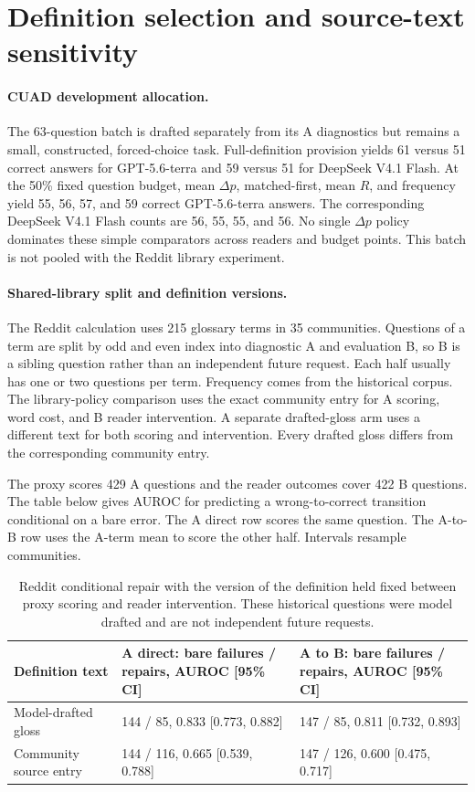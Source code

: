 \section{Definition selection and source-text sensitivity}
\label{app:new}
\paragraph{CUAD development allocation.}
The 63-question batch is drafted separately from its A diagnostics but remains a small, constructed, forced-choice task. Full-definition provision yields 61 versus 51 correct answers for GPT-5.6-terra and 59 versus 51 for DeepSeek V4.1 Flash. At the 50\% fixed question budget, mean $\Delta p$, matched-first, mean $R$, and frequency yield 55, 56, 57, and 59 correct GPT-5.6-terra answers. The corresponding DeepSeek V4.1 Flash counts are 56, 55, 55, and 56. No single $\Delta p$ policy dominates these simple comparators across readers and budget points. This batch is not pooled with the Reddit library experiment.

\paragraph{Shared-library split and definition versions.}
The Reddit calculation uses 215 glossary terms in 35 communities. Questions of a term are split by odd and even index into diagnostic A and evaluation B, so B is a sibling question rather than an independent future request. Each half usually has one or two questions per term. Frequency comes from the historical corpus. The library-policy comparison uses the exact community entry for A scoring, word cost, and B reader intervention. A separate drafted-gloss arm uses a different text for both scoring and intervention. Every drafted gloss differs from the corresponding community entry.

The proxy scores 429 A questions and the reader outcomes cover 422 B questions. The table below gives AUROC for predicting a wrong-to-correct transition conditional on a bare error. The A direct row scores the same question. The A-to-B row uses the A-term mean to score the other half. Intervals resample communities.

\begin{table}[htbp]\centering\small
\caption{Reddit conditional repair with the version of the definition held fixed between proxy scoring and reader intervention. These historical questions were model drafted and are not independent future requests.}
\label{tab:gold-source-repair}
\begin{tabular}{@{}p{2.8cm}p{4.3cm}p{4.3cm}@{}}\toprule
Definition text & A direct: bare failures / repairs, AUROC [95\% CI] & A to B: bare failures / repairs, AUROC [95\% CI]\\\midrule
Model-drafted gloss & 144 / 85, 0.833 [0.773, 0.882] & 147 / 85, 0.811 [0.732, 0.893]\\
Community source entry & 144 / 116, 0.665 [0.539, 0.788] & 147 / 126, 0.600 [0.475, 0.717]\\\bottomrule
\end{tabular}\end{table}

